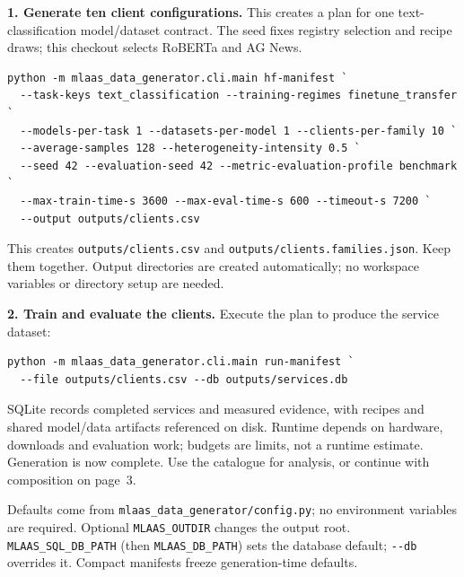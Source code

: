 \documentclass[10pt,a4paper]{article}
\newcommand{\code}[1]{\nolinkurl{#1}}
\newcommand{\lead}[1]{\par\smallskip\noindent\textbf{#1}\enspace}
\begin{document}
\lead{1. Generate ten client configurations.} This creates a plan for one text-classification model/dataset contract. The seed fixes registry selection and recipe draws; this checkout selects RoBERTa and AG News.
\begin{lstlisting}
python -m mlaas_data_generator.cli.main hf-manifest `
  --task-keys text_classification --training-regimes finetune_transfer `
  --models-per-task 1 --datasets-per-model 1 --clients-per-family 10 `
  --average-samples 128 --heterogeneity-intensity 0.5 `
  --seed 42 --evaluation-seed 42 --metric-evaluation-profile benchmark `
  --max-train-time-s 3600 --max-eval-time-s 600 --timeout-s 7200 `
  --output outputs/clients.csv
\end{lstlisting}
This creates \code{outputs/clients.csv} and \code{outputs/clients.families.json}. Keep them together. Output directories are created automatically; no workspace variables or directory setup are needed.

\lead{2. Train and evaluate the clients.} Execute the plan to produce the service dataset:
\begin{lstlisting}
python -m mlaas_data_generator.cli.main run-manifest `
  --file outputs/clients.csv --db outputs/services.db
\end{lstlisting}
SQLite records completed services and measured evidence, with recipes and shared model/data artifacts referenced on disk. Runtime depends on hardware, downloads and evaluation work; budgets are limits, not a runtime estimate. Generation is now complete. Use the catalogue for analysis, or continue with composition on page~3.

Defaults come from \code{mlaas_data_generator/config.py}; no environment variables are required. Optional \code{MLAAS_OUTDIR} changes the output root. \code{MLAAS_SQL_DB_PATH} (then \code{MLAAS_DB_PATH}) sets the database default; \code{--db} overrides it. Compact manifests freeze generation-time defaults.
\end{document}
